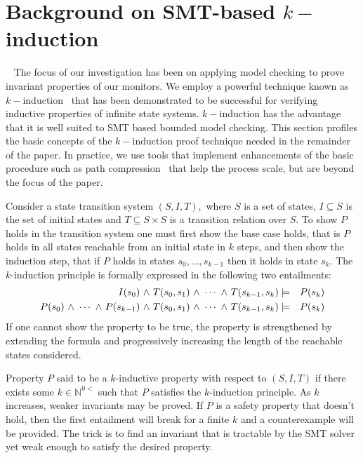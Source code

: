 \section{Background on SMT-based $k-$induction}~\label{sec:background} 
The focus of our  investigation has  been on applying model checking to  prove
invariant properties of our monitors.   We  
employ a powerful technique known as $k-$induction~\cite{Sheeran00,
  EenS03} that has been demonstrated to be successful for verifying inductive
properties of infinite state systems.   $k-$induction  has the
advantage that it is well suited  to  SMT 
based bounded model checking. This section profiles the
basic concepts of the  $k-$induction proof technique needed in the
remainder of the paper. In practice, we
use tools that implement  enhancements of the basic procedure such as path
compression~\cite{dMRS03} that help the process scale, but are beyond
the focus of the paper. 

Consider  a state transition system  $(S,I,T),$
where $S$ is a set of states, $I \subseteq S$ is the set of initial
states and $T \subseteq S \times S $ is a transition relation over
$S.$ To show $P$ holds in the transition system one must first
show the base case holds, that is $P$ holds in all states reachable
from an initial state in $k$ steps, and then show the induction step,
that if $P$ holds in states $s_0,\ldots,s_{k-1}$ then it holds in
state $s_k.$ The $k$-induction principle is formally expressed in the
following two entailments:
\begin{eqnarray*}
I(s_0) {\ \wedge \ } T(s_0,s_1) {\ \wedge \ } \cdots {\ \wedge \ } T(s_{k-1},s_k) &\models&
P(s_k) \\
P(s_0) {\ \wedge \ } \cdots {\ \wedge \ } P(s_{k-1}) {\ \wedge \ } T(s_0,s_1) {\ \wedge \ } \cdots {\ \wedge \ } T(s_{k-1},s_k) &\models&
P(s_k) 
\end{eqnarray*} 
If one cannot show the property to be true, the
property is strengthened by extending the formula and
progressively increasing the length of the reachable states
considered.  

Property $P$ said to be a $k$-inductive property with respect to
$(S,I,T)$ if there exists some $k \in \mathbb{N}^{0<}$ such that $P$
satisfies the $k$-induction principle. As $k$ increases, weaker
invariants may be proved. If $P$ is a safety property that doesn't hold, then the first entailment will break for a finite $k$ and a counterexample will be provided. The trick is to find an invariant that is
tractable by the SMT solver yet weak enough to satisfy the desired
property.  

